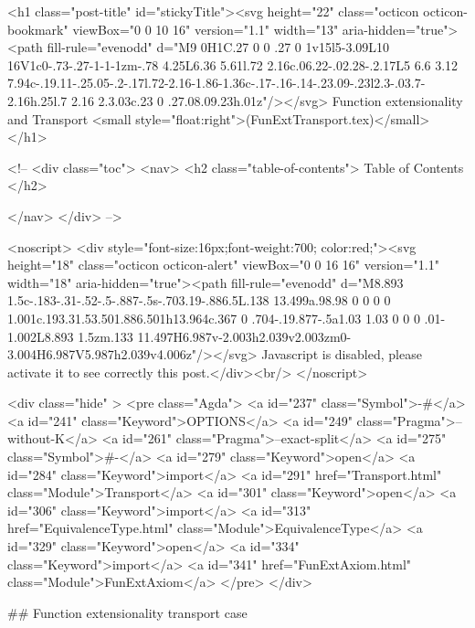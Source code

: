   <h1 class="post-title" id="stickyTitle"><svg height="22" class="octicon octicon-bookmark" viewBox="0 0 10 16" version="1.1" width="13" aria-hidden="true"><path fill-rule="evenodd" d="M9 0H1C.27 0 0 .27 0 1v15l5-3.09L10 16V1c0-.73-.27-1-1-1zm-.78 4.25L6.36 5.61l.72 2.16c.06.22-.02.28-.2.17L5 6.6 3.12 7.94c-.19.11-.25.05-.2-.17l.72-2.16-1.86-1.36c-.17-.16-.14-.23.09-.23l2.3-.03.7-2.16h.25l.7 2.16 2.3.03c.23 0 .27.08.09.23h.01z"/></svg> Function extensionality and Transport <small style="float:right">(FunExtTransport.tex)</small>
  </h1>

  <!-- 
  <div class="toc">
    <nav>
    <h2 class="table-of-contents"> Table of Contents </h2>
      

    </nav>
  </div>
   -->

  <noscript>
  <div style="font-size:16px;font-weight:700; color:red;"><svg height="18" class="octicon octicon-alert" viewBox="0 0 16 16" version="1.1" width="18" aria-hidden="true"><path fill-rule="evenodd" d="M8.893 1.5c-.183-.31-.52-.5-.887-.5s-.703.19-.886.5L.138 13.499a.98.98 0 0 0 0 1.001c.193.31.53.501.886.501h13.964c.367 0 .704-.19.877-.5a1.03 1.03 0 0 0 .01-1.002L8.893 1.5zm.133 11.497H6.987v-2.003h2.039v2.003zm0-3.004H6.987V5.987h2.039v4.006z"/></svg> Javascript is disabled, please activate it to see correctly this post.</div><br/>
  </noscript>

  <div class="hide" >
<pre class="Agda">
<a id="237" class="Symbol">{-#</a> <a id="241" class="Keyword">OPTIONS</a> <a id="249" class="Pragma">--without-K</a> <a id="261" class="Pragma">--exact-split</a> <a id="275" class="Symbol">#-}</a>
<a id="279" class="Keyword">open</a> <a id="284" class="Keyword">import</a> <a id="291" href="Transport.html" class="Module">Transport</a>
<a id="301" class="Keyword">open</a> <a id="306" class="Keyword">import</a> <a id="313" href="EquivalenceType.html" class="Module">EquivalenceType</a>
<a id="329" class="Keyword">open</a> <a id="334" class="Keyword">import</a> <a id="341" href="FunExtAxiom.html" class="Module">FunExtAxiom</a>
</pre>
</div>

## Function extensionality transport case

